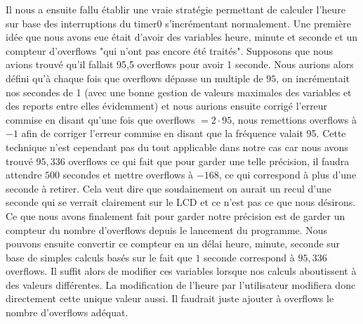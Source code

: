 \documentclass[12pt,a4paper]{article}
\begin{document}
    Il nous a ensuite fallu établir une vraie stratégie permettant de calculer l'heure sur base des interruptions du timer0 s'incrémentant normalement. Une première idée que nous avons eue était d'avoir des variables heure, minute et seconde et un compteur d'overflows "qui n'ont pas encore été traités". Supposons que nous avions trouvé qu'il fallait 95,5 overflows pour avoir 1 seconde. Nous aurions alors défini qu'à chaque fois que overflows dépasse un multiple de $95$, on incrémentait nos secondes de 1 (avec une bonne gestion de valeurs maximales des variables et des reports entre elles évidemment) et nous aurions ensuite corrigé l'erreur commise en disant qu'une fois que overflows $= 2\cdot 95$, nous remettions overflows à $-1$ afin de corriger l'erreur commise en disant que la fréquence valait 95. Cette technique n'est cependant pas du tout applicable dans notre cas car nous avons trouvé $95,336$ overflows ce qui fait que pour garder une telle précision, il faudra attendre $500$ secondes et mettre overflows à $-168$, ce qui correspond à plus d'une seconde à retirer. Cela veut dire que soudainement on aurait un recul d'une seconde qui se verrait clairement sur le LCD et ce n'est pas ce que nous désirons.\\
    
    Ce que nous avons finalement fait pour garder notre précision est de garder un compteur du nombre d'overflows depuis le lancement du programme. Nous pouvons ensuite convertir ce compteur en un délai heure, minute, seconde sur base de simples calculs basés sur le fait que $1$ seconde correspond à $95,336$ overflows. Il suffit alors de modifier ces variables lorsque nos calculs aboutissent à des valeurs différentes. La modification de l'heure par l'utilisateur modifiera donc directement cette unique valeur aussi. Il faudrait juste ajouter à overflows le nombre d'overflows adéquat.\\

\end{document}
